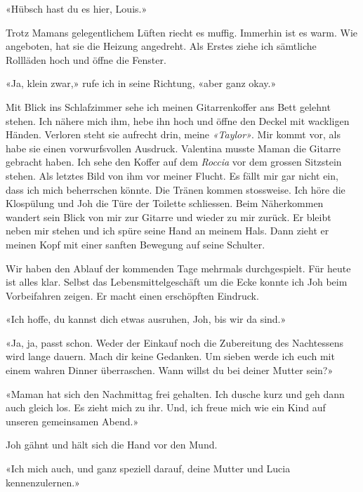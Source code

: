 «Hübsch hast du es hier, Louis.»

Trotz Mamans gelegentlichem Lüften riecht es muffig. Immerhin ist es warm. 
Wie angeboten, hat sie die Heizung angedreht. Als Erstes
ziehe ich sämtliche Rollläden hoch und öffne die Fenster.

«Ja, klein zwar,» rufe ich in seine Richtung, «aber ganz okay.»

Mit Blick ins Schlafzimmer sehe ich meinen Gitarrenkoffer ans Bett
gelehnt stehen. Ich nähere mich ihm, hebe ihn hoch und öffne den Deckel
mit wackligen Händen. Verloren steht sie aufrecht
drin, meine \emph{«Taylor»}. Mir kommt vor, als habe sie einen
vorwurfsvollen Ausdruck. Valentina musste Maman die Gitarre gebracht
haben. Ich sehe den Koffer auf dem \emph{Roccia} vor dem grossen Sitzstein stehen.
Als letztes Bild von ihm vor meiner Flucht.  Es fällt mir gar nicht ein, dass ich mich beherrschen könnte.  
Die Tränen kommen stossweise.
Ich höre die Klospülung und Joh die Türe der Toilette schliessen. Beim
Näherkommen wandert sein Blick von mir zur Gitarre und wieder zu mir zurück. Er bleibt neben mir stehen und ich spüre seine 
Hand an meinem Hals. Dann zieht er meinen Kopf mit einer sanften Bewegung auf seine Schulter.

\sectionbreak

Wir haben den Ablauf der kommenden Tage mehrmals durchgespielt. Für
heute ist alles klar. Selbst das Lebensmittelgeschäft um die Ecke konnte
ich Joh beim Vorbeifahren zeigen. Er macht einen erschöpften Eindruck.

«Ich hoffe, du kannst dich etwas ausruhen, Joh, bis wir da sind.»

«Ja, ja, passt schon. Weder der Einkauf noch die Zubereitung des
Nachtessens wird lange dauern. Mach dir keine Gedanken. Um sieben werde
ich euch mit einem wahren Dinner überraschen. Wann willst du bei deiner
Mutter sein?»

«Maman hat sich den Nachmittag frei gehalten. Ich dusche kurz und geh
dann auch gleich los. Es zieht mich zu ihr. Und, ich freue mich wie ein
Kind auf unseren gemeinsamen Abend.»

Joh gähnt und hält sich die Hand vor den Mund.

«Ich mich auch, und ganz speziell darauf, deine Mutter und Lucia kennenzulernen.»
